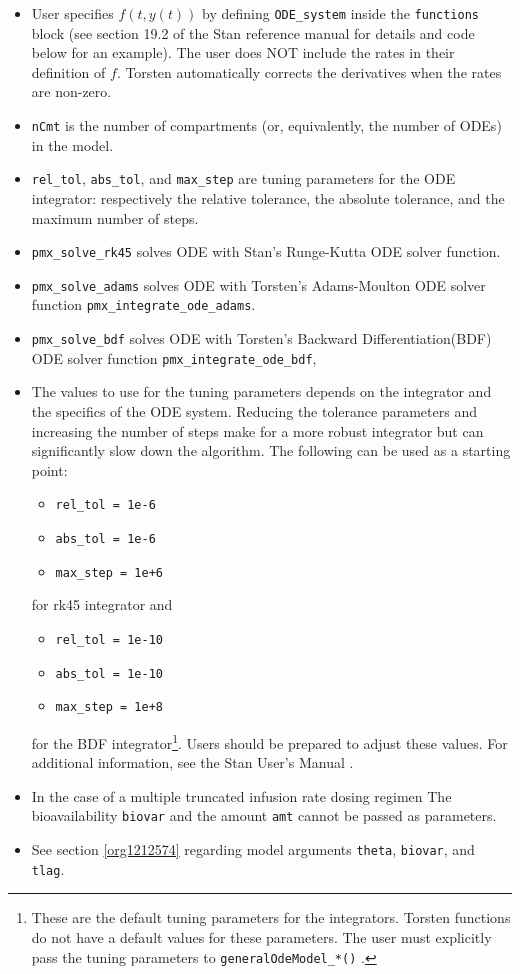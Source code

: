 \documentclass[11pt, reqno, oneside]{amsbook}
\numberwithin{equation}{chapter}
\numberwithin{figure}{chapter}
\numberwithin{table}{chapter}
\theoremstyle{remark}
\begin{document}
\begin{itemize}
\item User specifies \(f(t, y(t))\) by defining \texttt{ODE\_system}
inside the \texttt{functions} block (see section 19.2 of the
Stan reference manual for details and code below
for an example). The user does NOT include the rates in their
definition of \(f\). Torsten automatically corrects the derivatives when
the rates are non-zero.
\item \texttt{nCmt} is the number of compartments (or, equivalently, the
number of ODEs) in the model.
\item \texttt{rel\_tol}, \texttt{abs\_tol},
and \texttt{max\_step} are tuning parameters for the ODE integrator:
respectively the relative tolerance, the absolute tolerance, and the
maximum number of steps.
\item \texttt{pmx\_solve\_rk45} solves ODE with Stan's Runge-Kutta
ODE solver function.
\item \texttt{pmx\_solve\_adams} solves ODE with Torsten's Adams-Moulton ODE solver function \texttt{pmx\_integrate\_ode\_adams}.
\item \texttt{pmx\_solve\_bdf} solves ODE with Torsten's Backward
Differentiation(BDF) ODE solver function \texttt{pmx\_integrate\_ode\_bdf},
\item The values to use for the tuning parameters depends on the integrator and
the specifics of the ODE system. Reducing the tolerance parameters and
increasing the number of steps make for a more robust integrator but
can significantly slow down the algorithm. The following can be used
as a starting point: 
\begin{itemize}
\item \texttt{rel\_tol = 1e-6}
\item \texttt{abs\_tol = 1e-6}
\item \texttt{max\_step = 1e+6}
\end{itemize}
for rk45 integrator and
\begin{itemize}
\item \texttt{rel\_tol = 1e-10}
\item \texttt{abs\_tol = 1e-10}
\item \texttt{max\_step = 1e+8}
\end{itemize}
for the BDF integrator\footnote{These are the default tuning parameters for the integrators. Torsten functions do not have a default values for these parameters. The user must explicitly pass the tuning parameters to \texttt{generalOdeModel\_*()} .}.
Users should be prepared to adjust these
values. For additional information, see the Stan User's
Manual \cite{stan_team_2017}.
\item In the case of a multiple truncated infusion rate dosing regimen
The bioavailability \texttt{biovar} and the amount \texttt{amt} cannot be passed as parameters.
\item See section \ref{org1212574} regarding model arguments \texttt{theta},
\texttt{biovar}, and \texttt{tlag}.
\end{itemize}
\end{document}
